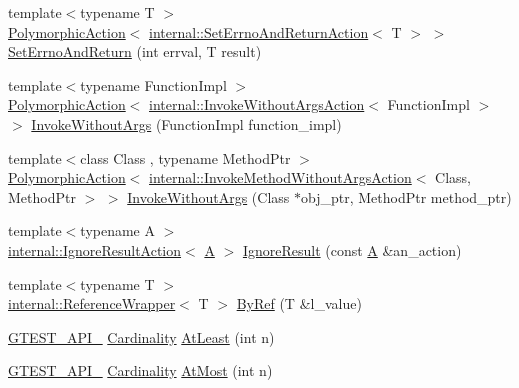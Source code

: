 \begin{DoxyCompactItemize}
\item 
{\footnotesize template$<$typename T $>$ }\\\hyperlink{classtesting_1_1_polymorphic_action}{Polymorphic\+Action}$<$ \hyperlink{classtesting_1_1internal_1_1_set_errno_and_return_action}{internal\+::\+Set\+Errno\+And\+Return\+Action}$<$ T $>$ $>$ \hyperlink{namespacetesting_a31095e421f167fade2e6d4d60df1f4da}{Set\+Errno\+And\+Return} (int errval, T result)
\item 
{\footnotesize template$<$typename Function\+Impl $>$ }\\\hyperlink{classtesting_1_1_polymorphic_action}{Polymorphic\+Action}$<$ \hyperlink{classtesting_1_1internal_1_1_invoke_without_args_action}{internal\+::\+Invoke\+Without\+Args\+Action}$<$ Function\+Impl $>$ $>$ \hyperlink{namespacetesting_a88cc1999296bc630f6a49cdf66bb21f9}{Invoke\+Without\+Args} (Function\+Impl function\+\_\+impl)
\item 
{\footnotesize template$<$class Class , typename Method\+Ptr $>$ }\\\hyperlink{classtesting_1_1_polymorphic_action}{Polymorphic\+Action}$<$ \hyperlink{classtesting_1_1internal_1_1_invoke_method_without_args_action}{internal\+::\+Invoke\+Method\+Without\+Args\+Action}$<$ Class, Method\+Ptr $>$ $>$ \hyperlink{namespacetesting_ab75325d71a8c37db94f349243815c728}{Invoke\+Without\+Args} (Class $\ast$obj\+\_\+ptr, Method\+Ptr method\+\_\+ptr)
\item 
{\footnotesize template$<$typename A $>$ }\\\hyperlink{classtesting_1_1internal_1_1_ignore_result_action}{internal\+::\+Ignore\+Result\+Action}$<$ \hyperlink{namespacetesting_a5e9134d655d2fc9323902348083282e7}{A} $>$ \hyperlink{namespacetesting_a50ae42540a31047c7fddd32df8d835f5}{Ignore\+Result} (const \hyperlink{namespacetesting_a5e9134d655d2fc9323902348083282e7}{A} \&an\+\_\+action)
\item 
{\footnotesize template$<$typename T $>$ }\\\hyperlink{classtesting_1_1internal_1_1_reference_wrapper}{internal\+::\+Reference\+Wrapper}$<$ T $>$ \hyperlink{namespacetesting_aaee6d42dcd69de6e7a1459c5c71222c3}{By\+Ref} (T \&l\+\_\+value)
\item 
\hyperlink{gtest-port_8h_aa73be6f0ba4a7456180a94904ce17790}{G\+T\+E\+S\+T\+\_\+\+A\+P\+I\+\_\+} \hyperlink{classtesting_1_1_cardinality}{Cardinality} \hyperlink{namespacetesting_a137297cb3c582843989fbd937cf0fed2}{At\+Least} (int n)
\item 
\hyperlink{gtest-port_8h_aa73be6f0ba4a7456180a94904ce17790}{G\+T\+E\+S\+T\+\_\+\+A\+P\+I\+\_\+} \hyperlink{classtesting_1_1_cardinality}{Cardinality} \hyperlink{namespacetesting_a5487cd1068c78821ced96fbf542a91bb}{At\+Most} (int n)

\end{DoxyCompactItemize}
